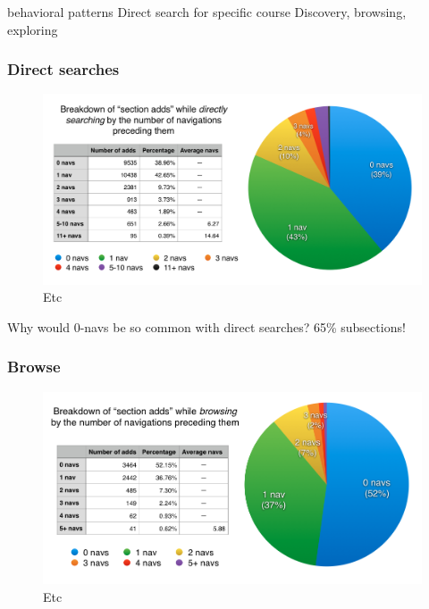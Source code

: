   behavioral patterns
  Direct search for specific course
  Discovery, browsing, exploring

  \subsubsection{Direct searches}

  \begin{figure}
    \centering
    \includegraphics[width=1.0\textwidth]{images/graph/direct_navs}

    \caption{Etc}
    \label{fig:searchtypes}
  \end{figure}

  Why would 0-navs be so common with direct searches? 65\% subsections!

  \subsubsection{Browse}


  \begin{figure}
    \centering
    \includegraphics[width=1.0\textwidth]{images/graph/browse_navs}

    \caption{Etc}
    \label{fig:searchtypes}
  \end{figure}

